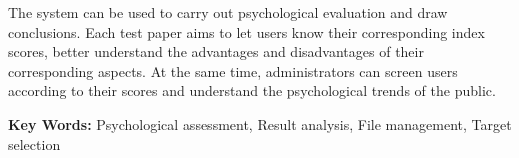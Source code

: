 The system can be used to carry out psychological evaluation and draw conclusions. Each test paper aims to let users know their corresponding index scores, better understand the advantages and disadvantages of their corresponding aspects. At the same time, administrators can screen users according to their scores and understand the psychological trends of the public.

\textbf{Key Words:} Psychological assessment, Result analysis, File management, Target selection \\




